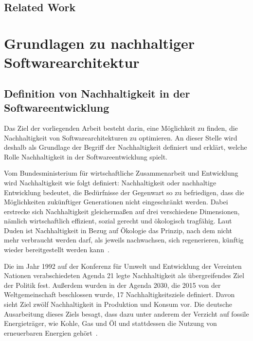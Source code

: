 \section{Related Work}

\chapter{Grundlagen zu nachhaltiger Softwarearchitektur}
\section{Definition von Nachhaltigkeit in der Softwareentwicklung}
Das Ziel der vorliegenden Arbeit besteht darin, eine Möglichkeit zu finden, die Nachhaltigkeit von Softwarearchitekturen zu optimieren.
An dieser Stelle wird deshalb als Grundlage der Begriff der Nachhaltigkeit definiert und erklärt, welche Rolle Nachhaltigkeit in der Softwareentwicklung spielt.

Vom Bundesministerium für wirtschaftliche Zusammenarbeit und Entwicklung~\cite{BundesministeriumWirtschaftlicheZusammenarbeitundEntwicklung} wird Nachhaltigkeit wie folgt definiert:
\glqq Nachhaltigkeit oder nachhaltige Entwicklung bedeutet, die Bedürfnisse der Gegenwart so zu befriedigen, dass die Möglichkeiten zukünftiger Generationen nicht eingeschränkt werden.\grqq{}
Dabei erstrecke sich Nachhaltigkeit gleichermaßen auf drei verschiedene Dimensionen, nämlich wirtschaftlich effizient, sozial gerecht und ökologisch tragfähig.
Laut Duden ist Nachhaltigkeit in Bezug auf Ökologie das \glqq Prinzip, nach dem nicht mehr verbraucht werden darf, als jeweils nachwachsen, sich regenerieren, künftig wieder bereitgestellt werden kann\grqq{}~\cite{Dudenredaktion.27.04.2018}.

Die im Jahr 1992 auf der Konferenz für Umwelt und Entwicklung der Vereinten Nationen verabschiedeten Agenda 21 legte Nachhaltigkeit als übergreifendes Ziel der Politik fest.
Außerdem wurden in der Agenda 2030, die 2015 von der Weltgemeinschaft beschlossen wurde, 17 Nachhaltigkeitsziele definiert.
Davon sieht Ziel zwölf Nachhaltigkeit in Produktion und Konsum vor.
Die deutsche Ausarbeitung dieses Ziels besagt, dass dazu unter anderem der Verzicht auf fossile Energieträger, wie Kohle, Gas und Öl und stattdessen die Nutzung von erneuerbaren Energien gehört~\cite{Bundesregierunginformiert}.

